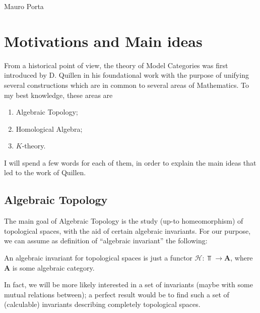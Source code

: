 \begin{flushright}
Mauro Porta
\end{flushright}

\section{Motivations and Main ideas}

From a historical point of view, the theory of Model Categories was first introduced by D. Quillen in his foundational work \cite{quillen} with the purpose of unifying several constructions which are in common to several areas of Mathematics. To my best knowledge, these areas are
\begin{enumerate}
\item Algebraic Topology;
\item Homological Algebra;
\item $K$-theory.
\end{enumerate}
I will spend a few words for each of them, in order to explain the main ideas that led to the work of Quillen.

\subsection{Algebraic Topology} \label{algebraic topology}

The main goal of Algebraic Topology is the study (up-to homeomorphism) of topological spaces, with the aid of certain algebraic invariants. For our purpose, we can assume as definition of ``algebraic invariant'' the following:
\begin{defin} \label{algebraic invariant}
An algebraic invariant for topological spaces is just a functor $\mathcal H \colon \Top \to \mathbf A$, where $\mathbf A$ is some algebraic category.
\end{defin}
In fact, we will be more likely interested in a set of invariants (maybe with some mutual relations between); a perfect result would be to find such a set of (calculable) invariants describing completely topological spaces.

